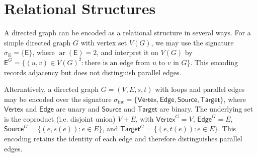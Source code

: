 \section{Relational Structures}\label{appendix:RS}


\begin{example}
    A directed graph can be encoded as a relational structure in several ways. For a simple directed graph $G$ with vertex set $V(G)$, we may use the signature $\sigma_{\mathrm{E}}=\{\mathsf{E}\}$, where $\operatorname{ar}(\mathsf{E})=2$, and interpret it on $V(G)$ by $\mathsf{E}^G=\{(u,v)\in V(G)^2 : \text{there is an edge from $u$ to $v$ in $G$}\}$. This encoding records adjacency but does not distinguish parallel edges.
\end{example}

\begin{example}
    Alternatively, a directed graph $G=(V,E,s,t)$ with loops and parallel edges may be encoded over the signature $\sigma_{\mathrm{inc}}=\{\mathsf{Vertex},\mathsf{Edge},\mathsf{Source},\mathsf{Target}\}$, where $\mathsf{Vertex}$ and $\mathsf{Edge}$ are unary and $\mathsf{Source}$ and $\mathsf{Target}$ are binary. The underlying set is the coproduct (i.e. disjoint union) $V+E$, with $\mathsf{Vertex}^G=V$, $\mathsf{Edge}^G=E$, $\mathsf{Source}^G=\{(e,s(e)):e\in E\}$, and $\mathsf{Target}^G=\{(e,t(e)):e\in E\}$. This encoding retains the identity of each edge and therefore distinguishes parallel edges.
\end{example}


